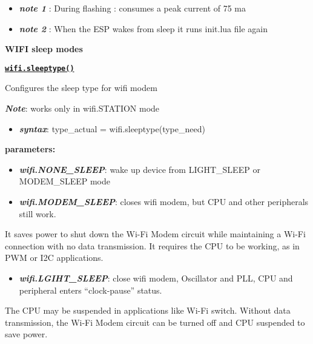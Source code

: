\documentclass[16pt]{article}
\begin{document}
\begin{itemize}

\item
  \textbf{\emph{note 1}} : During flashing : consumes a peak current of 75
  ma
\item
  \textbf{\emph{note 2}} : When the ESP wakes from sleep it runs init.lua file again
\end{itemize}

\vspace{0.5cm}
{\Large{\textbf{WIFI sleep modes}}}

\vspace{0.5cm}
{\underline{\texttt{\textbf{wifi.sleeptype()}}}}


\vspace{0.1cm}
  Configures the sleep type for wifi modem


\textbf{\emph{Note}}: works only in wifi.STATION mode

\begin{itemize}

\item
  \textbf{\emph{syntax}}: type\_actual = wifi.sleeptype(type\_need)
\end{itemize}

  \textbf{parameters:}

\begin{itemize}
\item
  \textbf{\emph{wifi.NONE\_SLEEP}}: wake up device from LIGHT\_SLEEP or MODEM\_SLEEP
  mode
\item
  \textbf{\emph{wifi.MODEM\_SLEEP}}: closes wifi modem, but CPU and other peripherals
  still work.
\end{itemize}

It saves power to shut down the Wi-Fi Modem circuit while maintaining a
Wi-Fi connection with no data transmission. It requires the CPU to be
working, as in PWM or I2C applications.

\begin{itemize}

\item
  \textbf{\emph{wifi.LGIHT\_SLEEP}}: close wifi modem, Oscillator and PLL, CPU and
  peripheral enters ``clock-pause'' status.
\end{itemize}

The CPU may be suspended in applications like Wi-Fi switch. Without data
transmission, the Wi-Fi Modem circuit can be turned off and CPU
suspended to save power.

\vspace{0.2cm}
\end{document}
